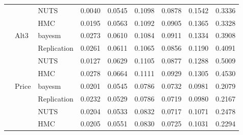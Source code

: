 \begin{tabular}{lllcccccc}
 &  & NUTS & 0.0040 & 0.0545 & 0.1098 & 0.0878 & 0.1542 & 0.3336 \\
 &  & HMC & 0.0195 & 0.0563 & 0.1092 & 0.0905 & 0.1365 & 0.3328 \\
 & Alt3 & bayesm & 0.0273 & 0.0610 & 0.1084 & 0.0911 & 0.1334 & 0.3908 \\
 &  & Replication & 0.0261 & 0.0611 & 0.1065 & 0.0856 & 0.1190 & 0.4091 \\
 &  & NUTS & 0.0127 & 0.0629 & 0.1105 & 0.0877 & 0.1288 & 0.5009 \\
 &  & HMC & 0.0278 & 0.0664 & 0.1111 & 0.0929 & 0.1305 & 0.4530 \\
 & Price & bayesm & 0.0201 & 0.0545 & 0.0786 & 0.0732 & 0.0981 & 0.2079 \\
 &  & Replication & 0.0232 & 0.0529 & 0.0786 & 0.0719 & 0.0980 & 0.2167 \\
 &  & NUTS & 0.0204 & 0.0533 & 0.0832 & 0.0717 & 0.1071 & 0.2478 \\
 &  & HMC & 0.0205 & 0.0551 & 0.0830 & 0.0725 & 0.1031 & 0.2294 \\
\bottomrule
\end{tabular}
